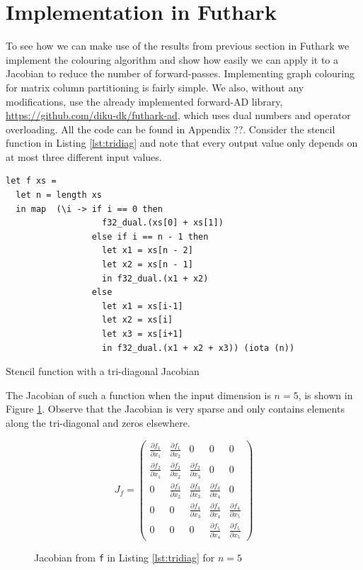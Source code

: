 	
	
	
	\section{Implementation in Futhark}
	To see how we can make use of the results from previous section 
	in Futhark we implement the colouring algorithm and show how easily
	we can apply it to a Jacobian to reduce the number of forward-passes. 
	Implementing graph colouring for matrix column partitioning is fairly simple. We
	also, without any modifications, use the already implemented forward-AD library,
	\url{https://github.com/diku-dk/futhark-ad}, which uses dual numbers and operator overloading. All the code can be found in
	Appendix ??. 
	Consider the stencil function in Listing \ref{lst:tridiag} and note that every
	output value only depends on at most three different input values.
\begin{listing}[H]
\begin{verbatim}
let f xs =
  let n = length xs
  in map  (\i -> if i == 0 then 
                   f32_dual.(xs[0] + xs[1])
                 else if i == n - 1 then
                   let x1 = xs[n - 2]
                   let x2 = xs[n - 1]
                   in f32_dual.(x1 + x2)
                 else
                   let x1 = xs[i-1]
                   let x2 = xs[i]
                   let x3 = xs[i+1]
                   in f32_dual.(x1 + x2 + x3)) (iota (n))
\end{verbatim}
\caption{Stencil function with a tri-diagonal Jacobian}
\label{lst:tridiag}
\end{listing}
	The Jacobian of such a function when the input dimension is $n= 5$, is shown in
	Figure \ref{fig:tridiag}. Observe that 
	the Jacobian is very sparse and only
	contains elements along the
	tri-diagonal and zeros elsewhere.  
	\begin{figure}[H]
		$$ J_{f} = \left(\begin{matrix}
		\frac{\partial f_1}{\partial x_1} & \frac{\partial f_1}{\partial x_2} & 0 & 0 &
		0 \\
		\frac{\partial f_2}{\partial x_1}& \frac{\partial f_2}{\partial x_2} &
		\frac{\partial f_2}{\partial x_3} & 0 & 0\\
		0 & \frac{\partial f_3}{\partial x_2} & \frac{\partial f_3}{\partial x_3} &
		\frac{\partial f_3}{\partial x_4} & 0\\
		0 & 0 & \frac{\partial f_4}{\partial x_3} & \frac{\partial f_4}{\partial x_4} &
		\frac{\partial f_4}{\partial x_5} \\
		0 & 0 & 0 & \frac{\partial f_5}{\partial x_4} & \frac{\partial f_5}{\partial
			x_5}
		\end{matrix}\right) $$
		\caption{Jacobian from \texttt{f} in Listing \ref{lst:tridiag} for $n=5$}
		\label{fig:tridiag}
	\end{figure}
